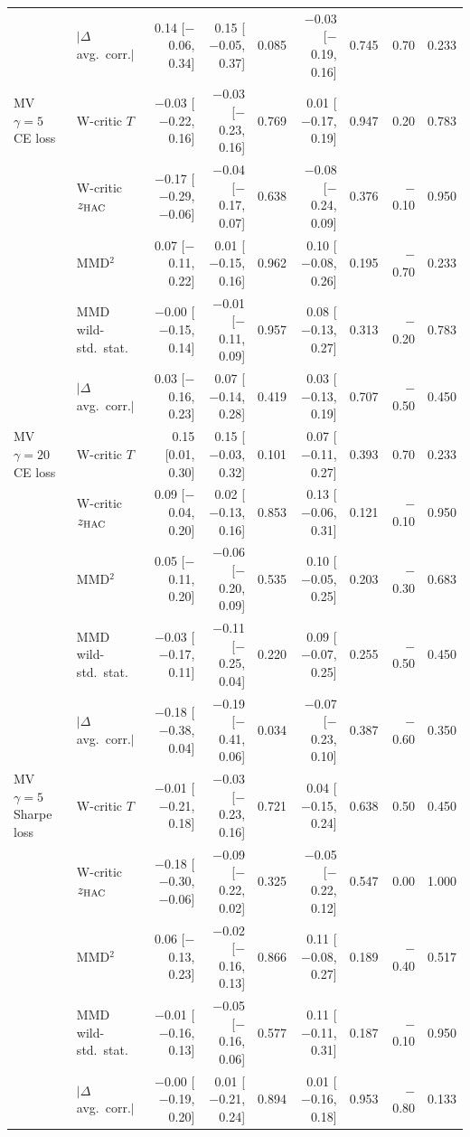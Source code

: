 \begin{tabular}{llrrrrrrr}
 & $|\Delta$ avg.\ corr.$|$ & 0.14 [$-$0.06, 0.34] & 0.15 [$-$0.05, 0.37] & 0.085 & $-$0.03 [$-$0.19, 0.16] & 0.745 & 0.70 & 0.233 \\
MV $\gamma=5$ CE loss & W-critic $T$ & $-$0.03 [$-$0.22, 0.16] & $-$0.03 [$-$0.23, 0.16] & 0.769 & 0.01 [$-$0.17, 0.19] & 0.947 & 0.20 & 0.783 \\
 & W-critic $z_{\rm HAC}$ & $-$0.17 [$-$0.29, $-$0.06] & $-$0.04 [$-$0.17, 0.07] & 0.638 & $-$0.08 [$-$0.24, 0.09] & 0.376 & $-$0.10 & 0.950 \\
 & MMD$^2$ & 0.07 [$-$0.11, 0.22] & 0.01 [$-$0.15, 0.16] & 0.962 & 0.10 [$-$0.08, 0.26] & 0.195 & $-$0.70 & 0.233 \\
 & MMD wild-std.\ stat. & $-$0.00 [$-$0.15, 0.14] & $-$0.01 [$-$0.11, 0.09] & 0.957 & 0.08 [$-$0.13, 0.27] & 0.313 & $-$0.20 & 0.783 \\
 & $|\Delta$ avg.\ corr.$|$ & 0.03 [$-$0.16, 0.23] & 0.07 [$-$0.14, 0.28] & 0.419 & 0.03 [$-$0.13, 0.19] & 0.707 & $-$0.50 & 0.450 \\
MV $\gamma=20$ CE loss & W-critic $T$ & 0.15 [0.01, 0.30] & 0.15 [$-$0.03, 0.32] & 0.101 & 0.07 [$-$0.11, 0.27] & 0.393 & 0.70 & 0.233 \\
 & W-critic $z_{\rm HAC}$ & 0.09 [$-$0.04, 0.20] & 0.02 [$-$0.13, 0.16] & 0.853 & 0.13 [$-$0.06, 0.31] & 0.121 & $-$0.10 & 0.950 \\
 & MMD$^2$ & 0.05 [$-$0.11, 0.20] & $-$0.06 [$-$0.20, 0.09] & 0.535 & 0.10 [$-$0.05, 0.25] & 0.203 & $-$0.30 & 0.683 \\
 & MMD wild-std.\ stat. & $-$0.03 [$-$0.17, 0.11] & $-$0.11 [$-$0.25, 0.04] & 0.220 & 0.09 [$-$0.07, 0.25] & 0.255 & $-$0.50 & 0.450 \\
 & $|\Delta$ avg.\ corr.$|$ & $-$0.18 [$-$0.38, 0.04] & $-$0.19 [$-$0.41, 0.06] & 0.034 & $-$0.07 [$-$0.23, 0.10] & 0.387 & $-$0.60 & 0.350 \\
MV $\gamma=5$ Sharpe loss & W-critic $T$ & $-$0.01 [$-$0.21, 0.18] & $-$0.03 [$-$0.23, 0.16] & 0.721 & 0.04 [$-$0.15, 0.24] & 0.638 & 0.50 & 0.450 \\
 & W-critic $z_{\rm HAC}$ & $-$0.18 [$-$0.30, $-$0.06] & $-$0.09 [$-$0.22, 0.02] & 0.325 & $-$0.05 [$-$0.22, 0.12] & 0.547 & 0.00 & 1.000 \\
 & MMD$^2$ & 0.06 [$-$0.13, 0.23] & $-$0.02 [$-$0.16, 0.13] & 0.866 & 0.11 [$-$0.08, 0.27] & 0.189 & $-$0.40 & 0.517 \\
 & MMD wild-std.\ stat. & $-$0.01 [$-$0.16, 0.13] & $-$0.05 [$-$0.16, 0.06] & 0.577 & 0.11 [$-$0.11, 0.31] & 0.187 & $-$0.10 & 0.950 \\
 & $|\Delta$ avg.\ corr.$|$ & $-$0.00 [$-$0.19, 0.20] & 0.01 [$-$0.21, 0.24] & 0.894 & 0.01 [$-$0.16, 0.18] & 0.953 & $-$0.80 & 0.133 \\
\bottomrule
\end{tabular}
